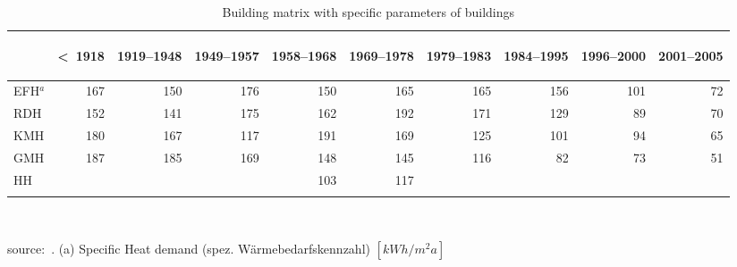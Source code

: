 \begin{table}[htbp]
  \centering
  \caption{Building matrix with specific parameters of
  buildings}\label{tab:BW}%
    \begin{tabular}{l r rrrrrrrr}
    \addlinespace
    \toprule
    &
    \begin{sideways}\textless~1918	\end{sideways}&  
    \begin{sideways}1919--1948   \end{sideways}&  
    \begin{sideways}1949--1957   \end{sideways}&  
    \begin{sideways}1958--1968   \end{sideways}&  
    \begin{sideways}1969--1978   \end{sideways}&  
    \begin{sideways}1979--1983   \end{sideways}&  
    \begin{sideways}1984--1995   \end{sideways}&  
    \begin{sideways}1996--2000   \end{sideways}&  
    \begin{sideways}2001--2005   \end{sideways}\\
    \midrule
EFH$^a$&167&  150&  176&   150&   165&165& 156& 101&  72\\
RDH&    152&  141&  175&   162&   192&171& 129&  89&  70\\
KMH&    180&  167&  117&   191&   169&125& 101&  94&  65\\
GMH&    187&  185&  169&   148&   145&116&  82&  73&  51\\
HH &       &     &     &   103&   117&   &    &    &     \\
    \bottomrule
    \addlinespace
    \end{tabular}\\
    \begin{footnotesize}    
    source:~\cite{Blesl.2007}.
    (a) Specific Heat demand (spez. W\"armebedarfskennzahl)
    $[kWh/m^{2}a]$\\
    
    \end{footnotesize}
\end{table}